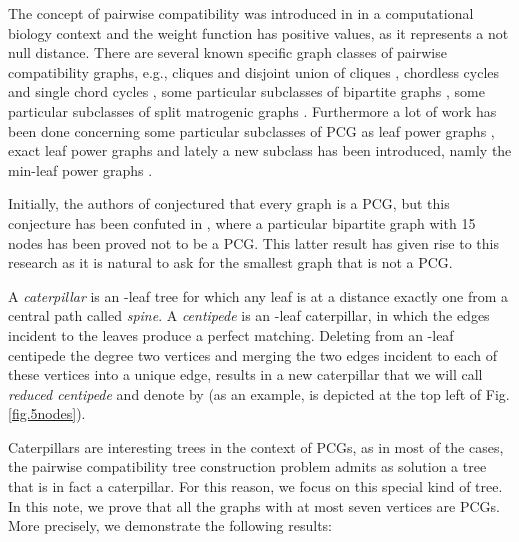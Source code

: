 \documentclass[review]{elsarticle}
\begin{document}
The concept of pairwise compatibility was introduced in \cite{Kal03} in a computational biology context and the weight function  has positive values, as it represents a not null distance.  There are several known specific graph classes of pairwise compatibility graphs, e.g., cliques and disjoint union of cliques \cite{B}, chordless cycles and single chord cycles \cite{YHR09}, some  particular subclasses of bipartite graphs \cite{YBR10}, some particular subclasses of split matrogenic graphs \cite{CPS12}.  Furthermore a lot of work has been done concerning some particular subclasses of PCG as leaf power graphs \cite{B}, exact leaf power graphs \cite{BLR10} and lately a new subclass has been introduced, namly the min-leaf power graphs \cite{CPS12}.

Initially, the authors of \cite{Kal03} conjectured that every graph is a PCG, but this conjecture has been confuted in \cite{YBR10}, where a particular bipartite graph with 15 nodes has been proved not to be a PCG. 
This latter result has given rise to this research as it is natural to ask for the smallest graph that is not a PCG.

\medskip

A {\em caterpillar}  is an -leaf tree for which any leaf is at a distance exactly one from a central path called {\em spine}.
A {\em centipede} is an -leaf caterpillar, in which the edges incident to the leaves produce a perfect matching.
Deleting from an -leaf centipede the degree two vertices and merging the two edges incident to each of these vertices into a unique edge, results in a new caterpillar that we will call {\em reduced centipede} and denote by   (as an example,  is depicted at the top left of  Fig. \ref{fig.5nodes}).

Caterpillars are interesting trees in the context of PCGs, as in most of the cases, the pairwise compatibility tree construction problem admits as solution a tree that is in fact a caterpillar.
For this reason, we focus on this special kind of tree.
In this note, we prove that all the graphs with at most seven vertices are PCGs. More precisely, we demonstrate the following results:
\end{document}
